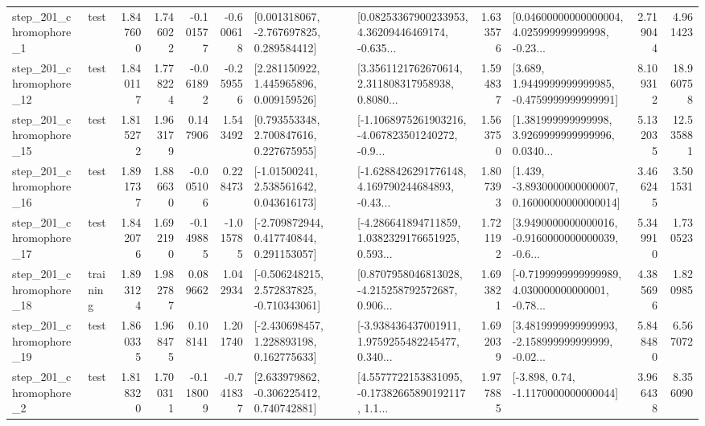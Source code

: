 \begin{tabular}{llrrrrllrlrr}
   step\_201\_chromophore\_1 &      test &      1.847600 &    1.746022 &     -0.101577 & -0.600618 &    [0.001318067, -2.767697825, 0.289584412] &  [0.08253367900233953, 4.36209446469174, -0.635... &       1.633576 &  [0.04600000000000004, 4.025999999999998, -0.23... &            2.719044 &          4.961423 \\
  step\_201\_chromophore\_12 &      test &      1.840117 &    1.778224 &     -0.061892 & -0.259556 &     [2.281150922, 1.445965896, 0.009159526] &  [3.3561121762670614, 2.311808317958938, 0.8080... &       1.594837 &   [3.689, 1.9449999999999985, -0.4759999999999991] &            8.109312 &         18.960758 \\
  step\_201\_chromophore\_15 &      test &      1.815272 &    1.963179 &      0.147906 &  1.543492 &     [0.793553348, 2.700847616, 0.227675955] &  [-1.1068975261903216, -4.067823501240272, -0.9... &       1.563750 &  [1.381999999999998, 3.9269999999999996, 0.0340... &            5.132035 &         12.535881 \\
  step\_201\_chromophore\_16 &      test &      1.891737 &    1.886630 &     -0.005106 &  0.228473 &     [-1.01500241, 2.538561642, 0.043616173] &  [-1.6288426291776148, 4.169790244684893, -0.43... &       1.807393 &  [1.439, -3.8930000000000007, 0.16000000000000014] &            3.466245 &          3.501531 \\
  step\_201\_chromophore\_17 &      test &      1.842076 &    1.692190 &     -0.149885 & -1.015785 &    [-2.709872944, 0.417740844, 0.291153057] &  [-4.286641894711859, 1.0382329176651925, 0.593... &       1.721192 &  [3.9490000000000016, -0.9160000000000039, -0.6... &            5.349910 &          1.730523 \\
  step\_201\_chromophore\_18 &  training &      1.893124 &    1.982787 &      0.089662 &  1.042934 &   [-0.506248215, 2.572837825, -0.710343061] &  [0.8707958046813028, -4.215258792572687, 0.906... &       1.693821 &  [-0.7199999999999989, 4.030000000000001, -0.78... &            4.385696 &          1.820985 \\
  step\_201\_chromophore\_19 &      test &      1.860335 &    1.968475 &      0.108141 &  1.201740 &    [-2.430698457, 1.228893198, 0.162775633] &  [-3.938436437001911, 1.9759255482245477, 0.340... &       1.692039 &  [3.4819999999999993, -2.158999999999999, -0.02... &            5.848480 &          6.567072 \\
   step\_201\_chromophore\_2 &      test &      1.818320 &    1.700311 &     -0.118009 & -0.741837 &    [2.633979862, -0.306225412, 0.740742881] &  [4.5577722153831095, -0.17382665890192117, 1.1... &       1.977885 &                [-3.898, 0.74, -1.1170000000000044] &            3.966438 &          8.356090 \\

\end{tabular}
